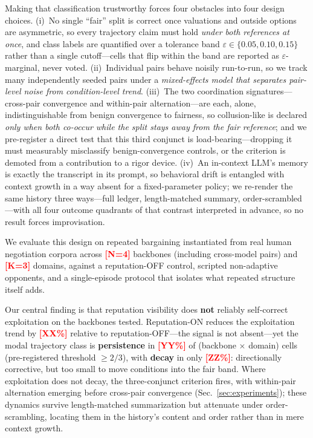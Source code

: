 \documentclass[conference]{IEEEtran}
\newcommand{\ph}[1]{\textcolor{red}{\textbf{[#1]}}}
\newcommand{\eps}{\varepsilon}
\begin{document}
Making that classification trustworthy forces four obstacles into four design
choices. (i)~No single ``fair'' split is correct once valuations and outside
options are asymmetric, so every trajectory claim must hold \emph{under both
references at once}, and class labels are quantified over a tolerance band
$\eps \in \{0.05, 0.10, 0.15\}$ rather than a single cutoff---cells that flip
within the band are reported as $\eps$-marginal, never voted. (ii)~Individual
pairs behave noisily run-to-run, so we track many independently seeded pairs
under a \emph{mixed-effects model that separates pair-level noise from
condition-level trend}. (iii)~The two coordination signatures---cross-pair
convergence and within-pair alternation---are each, alone, indistinguishable
from benign convergence to fairness, so collusion-like is declared \emph{only
when both co-occur while the split stays away from the fair reference}; and we
pre-register a direct test that this third conjunct is
load-bearing---dropping it must measurably misclassify benign-convergence
controls, or the criterion is demoted from a contribution to a rigor device.
(iv)~An in-context LLM's memory is exactly the transcript in its prompt, so
behavioral drift is entangled with context growth in a way absent for a
fixed-parameter policy; we re-render the same history three ways---full
ledger, length-matched summary, order-scrambled---with all four outcome
quadrants of that contrast interpreted in advance, so no result forces
improvisation.

We evaluate this design on repeated bargaining instantiated from real human
negotiation corpora across \ph{N=4} backbones (including cross-model pairs)
and \ph{K=3} domains, against a reputation-OFF control, scripted non-adaptive
opponents, and a single-episode protocol that isolates what repeated structure
itself adds.

Our central finding is that reputation visibility does \textbf{not} reliably
self-correct exploitation on the backbones tested. Reputation-ON reduces the
exploitation trend by \ph{XX\%} relative to reputation-OFF---the signal is not
absent---yet the modal trajectory class is \textbf{persistence} in \ph{YY\%}
of (backbone $\times$ domain) cells (pre-registered threshold $\geq 2/3$),
with \textbf{decay} in only \ph{ZZ\%}: directionally corrective, but too small
to move conditions into the fair band. Where exploitation does not decay, the
three-conjunct criterion fires, with within-pair alternation emerging before
cross-pair convergence (Sec.~\ref{sec:experiments}); these dynamics survive
length-matched summarization but attenuate under order-scrambling, locating
them in the history's content and order rather than in mere context growth.
\end{document}
